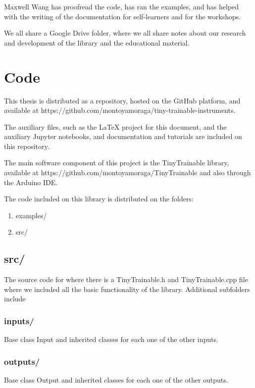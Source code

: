 Maxwell Wang has proofread the code, has ran the examples, and has helped with the writing of the documentation for self-learners and for the workshops.

We all share a Google Drive folder, where we all share notes about our research and development of the library and the educational material.

\section{Code}

This thesis is distributed as a repository, hosted on the GitHub platform, and available at https://github.com/montoyamoraga/tiny-trainable-instruments.

The auxiliary files, such as the LaTeX project for this document, and the auxiliary Jupyter notebooks, and documentation and tutorials are included on this repository.

The main software component of this project is the TinyTrainable library, available at https://github.com/montoyamoraga/TinyTrainable and also through the Arduino IDE.

The code included on this library is distributed on the folders:

\begin{enumerate}
  \item examples/
  \item src/
\end{enumerate}

\subsection{src/}

The source code for where there is a TinyTrainable.h and TinyTrainable.cpp file where we included all the basic functionality of the library. Additional subfolders include

\subsubsection{inputs/}

Base class Input and inherited classes for each one of the other inputs.

\subsubsection{outputs/}

Base class Output and inherited classes for each one of the other outputs.

